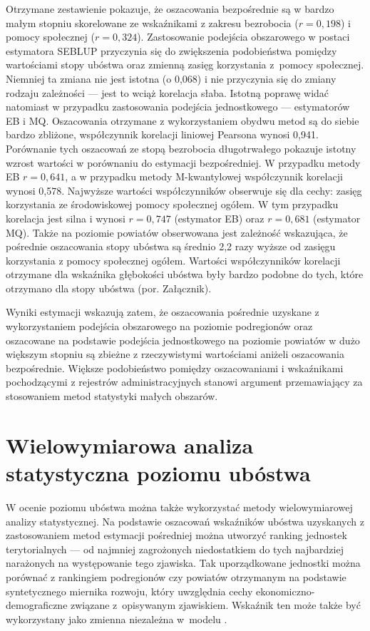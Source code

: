 Otrzymane zestawienie pokazuje, że oszacowania bezpośrednie są w bardzo małym stopniu skorelowane ze wskaźnikami z zakresu bezrobocia ($r=0,198$) i pomocy społecznej ($r=0,324$). Zastosowanie podejścia obszarowego w postaci estymatora SEBLUP przyczynia się do zwiększenia podobieństwa pomiędzy wartościami stopy ubóstwa oraz zmienną zasięg korzystania z~pomocy społecznej. Niemniej ta zmiana nie jest istotna (o 0,068) i nie przyczynia się do zmiany rodzaju zależności --- jest to wciąż korelacja słaba. Istotną poprawę widać natomiast w przypadku zastosowania podejścia jednostkowego --- estymatorów EB i MQ. Oszacowania otrzymane z wykorzystaniem obydwu metod są do siebie bardzo zbliżone, współczynnik korelacji liniowej Pearsona wynosi 0,941. Porównanie tych oszacowań ze stopą bezrobocia długotrwałego pokazuje istotny wzrost wartości w porównaniu do estymacji bezpośredniej. W przypadku metody EB $r=0,641$, a w przypadku metody M-kwantylowej współczynnik korelacji wynosi 0,578. Najwyższe wartości współczynników obserwuje się dla cechy: zasięg korzystania ze środowiskowej pomocy społecznej ogółem. W tym przypadku korelacja jest silna i wynosi $r=0,747$ (estymator EB) oraz $r=0,681$ (estymator MQ). Także na poziomie powiatów obserwowana jest zależność wskazująca, że pośrednie oszacowania stopy ubóstwa są średnio 2,2 razy wyższe od zasięgu korzystania z pomocy społecznej ogółem. Wartości współczynników korelacji otrzymane dla wskaźnika głębokości ubóstwa były bardzo podobne do tych, które otrzymano dla stopy ubóstwa (por. Załącznik).

Wyniki estymacji wskazują zatem, że oszacowania pośrednie uzyskane z wykorzystaniem podejścia obszarowego na poziomie podregionów oraz oszacowane na podstawie podejścia jednostkowego na poziomie powiatów w dużo większym stopniu są zbieżne z rzeczywistymi wartościami aniżeli oszacowania bezpośrednie. Większe podobieństwo pomiędzy oszacowaniami i wskaźnikami pochodzącymi z rejestrów administracyjnych stanowi argument przemawiający za stosowaniem metod statystyki małych obszarów.

\section{Wielowymiarowa analiza statystyczna poziomu ubóstwa}

W ocenie poziomu ubóstwa można także wykorzystać metody wielowymiarowej analizy statystycznej. Na podstawie oszacowań wskaźników ubóstwa uzyskanych z zastosowaniem metod estymacji pośredniej można utworzyć ranking jednostek terytorialnych --- od najmniej zagrożonych niedostatkiem do tych najbardziej narażonych na występowanie tego zjawiska. Tak uporządkowane jednostki można porównać z rankingiem podregionów czy powiatów otrzymanym na podstawie syntetycznego miernika rozwoju, który uwzględnia cechy ekonomiczno-demograficzne związane z~opisywanym zjawiskiem. Wskaźnik ten może także być wykorzystany jako zmienna niezależna w~modelu \citep{mlodak2016}.

